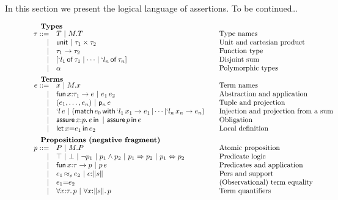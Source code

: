 In this section we present the logical language of assertions. To be
continued\dots

\begin{figure}
	\[
	\begin{array}{rl@{\qquad}l}
		\noalign{\textbf{Types}}
		\oty ::= 
		    & \oTY  \obar \oselect{\oM}{\oTY} &\mbox{Type names}\\
		  | & \ounit \obar \oprod{\oty_1}{\oty_2} &\mbox{Unit and cartesian product}\\
		  | & \oarrow{\oty_1}{\oty_2} & \mbox{Function type}\\
		  | & \osumty{\ol_1}{\oty_1}{\ol_n}{\oty_n} &\mbox{Disjoint sum}\\
                  | & \opty & \mbox{Polymorphic types}\\[5pt]
		
		\noalign{\textbf{Terms}}	
		\oe ::=
		    & \ox \obar \oselect{\oM}{\ox} &\mbox{Term names}\\
		  | & \olambda{\ox}{\oty_1}{\oe} \obar 
		      \oapp{\oe_1}{\oe_2} &\mbox{Abstraction and application}\\
		  | & \otuple{\oe_1}{\oe_n} 
		      \obar \oproj{\oe}{n}&\mbox{Tuple and projection}\\
		  | & \oinj{\ol}{\oe} 
		      \obar (\omatches{\oe_0}{\ol_1}{\ox_1}{\oe_1}{\ol_n}{\ox_n}{\oe_n})&\mbox{Injection and projection from a sum}\\
		  | & \ooblig{\ox}{\op}{\oe} \obar \oobligx{\op}{\oe} &\mbox{Obligation}\\
		  | & \olet{\ox}{\oe_1}{\oe_2}&\mbox{Local definition}\\[5pt]
		

		\noalign{\textbf{Propositions (negative fragment)}}
		\op ::= 
		    & \oP \obar \oselect{\oM}{\oP}&\mbox{Atomic
                      proposition}\\
		  | & \otrue  \obar \ofalse \obar \onot{\op_1} \obar \oand{\op_1}{\op_2} \obar 
		      \oimply{\op_1}{\op_2} \obar \oiff{\op_1}{\op_2} & \mbox{Predicate logic}\\
		  | & \olambda{\ox}{\oty}{\op}  \obar \oapp{\op}{\oe} & \mbox{Predicates and application}\\
                    | & \oper{\os}{\oe_1}{\oe_2} \obar \ototal{\oe}{\os} & \mbox{Pers and support} \\
		  | & \oequal{\oe_1}{\oe_2} & \mbox{(Observational) term equality}\\
		  | & \oforall{\ox}{\oty}{\op}  \obar 
		      \oforallt{\ox}{\os}{\op} & \mbox{Term quantifiers}\\[5pt]
		

\end{array}\]
\end{figure}
